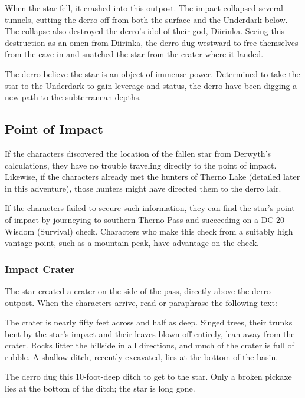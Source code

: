 \documentclass[10pt,a4paper,twoside,bg=print,twocolumn,openany,nodeprecatedcode]{dndbook}
\begin{document}
When the star fell, it crashed into this outpost. The impact collapsed several tunnels, cutting the derro off from both the surface and the Underdark below. The collapse also destroyed the derro's idol of their god, Diirinka. Seeing this destruction as an omen from Diirinka, the derro dug westward to free themselves from the cave-in and snatched the star from the crater where it landed.

The derro believe the star is an object of immense power. Determined to take the star to the Underdark to gain leverage and status, the derro have been digging a new path to the subterranean depths.

\subsection{Point of Impact}
If the characters discovered the location of the fallen star from Derwyth's calculations, they have no trouble traveling directly to the point of impact. Likewise, if the characters already met the hunters of Therno Lake (detailed later in this adventure), those hunters might have directed them to the derro lair.

If the characters failed to secure such information, they can find the star's point of impact by journeying to southern Therno Pass and succeeding on a DC 20 Wisdom (Survival) check. Characters who make this check from a suitably high vantage point, such as a mountain peak, have advantage on the check.

\subsubsection{Impact Crater}
The star created a crater on the side of the pass, directly above the derro outpost. When the characters arrive, read or paraphrase the following text:

\begin{DndReadAloud}{}
The crater is nearly fifty feet across and half as deep. Singed trees, their trunks bent by the star's impact and their leaves blown off entirely, lean away from the crater. Rocks litter the hillside in all directions, and much of the crater is full of rubble. A shallow ditch, recently excavated, lies at the bottom of the basin.

\end{DndReadAloud}

The derro dug this 10-foot-deep ditch to get to the star. Only a broken pickaxe lies at the bottom of the ditch; the star is long gone.
\end{document}
